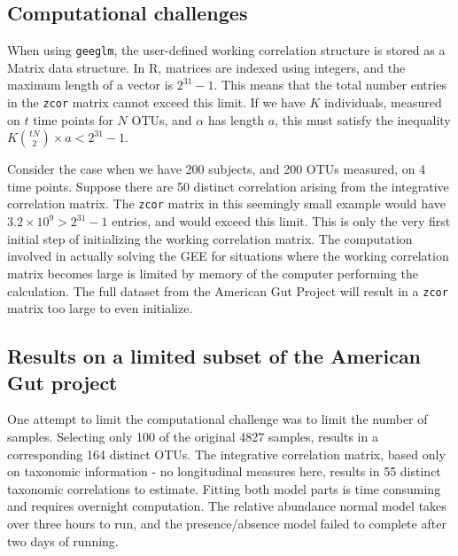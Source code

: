 \documentclass[12pt]{article}
\begin{document}
\subsection{Computational challenges}

When using \texttt{geeglm}, the user-defined working correlation structure is stored as a Matrix data structure. In R, matrices are indexed using integers, and the maximum length of a vector is $2^{31}-1$. This means that the total number entries in the \texttt{zcor} matrix cannot exceed this limit. If we have $K$ individuals, measured on $t$ time points for $N$ OTUs, and $\alpha$ has length $a$, this must satisfy the inequality $K \binom{tN}{2} \times a < 2^{31}-1$.

Consider the case when we have 200 subjects, and 200 OTUs measured, on 4 time points. Suppose there are 50 distinct correlation arising from the integrative correlation matrix. The \texttt{zcor} matrix in this seemingly small example would have $3.2 \times 10^9 > 2^{31}-1$ entries, and would exceed this limit. This is only the very first initial step of initializing the working correlation matrix. The computation involved in actually solving the GEE for situations where the working correlation matrix becomes large is limited by memory of the computer performing the calculation. The full dataset from the American Gut Project will result in a \texttt{zcor} matrix too large to even initialize.

\subsection{Results on a limited subset of the American Gut project}


One attempt to limit the computational challenge was to limit the number of samples. Selecting only 100 of the original 4827 samples, results in a corresponding 164 distinct OTUs. The integrative correlation matrix, based only on taxonomic information - no longitudinal measures here, results in 55 distinct taxonomic correlations to estimate. Fitting both model parts is time consuming and requires overnight computation. The relative abundance normal model takes over three hours to run, and the presence/absence model failed to complete after two days of running.
\end{document}
